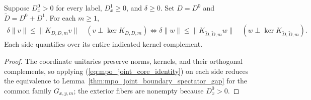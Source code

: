 
\begin{lemma}
    \label{thm:mpo_joint_normalized_gap_equivalence}
    \leanok
    Suppose $D_x^0>0$ for every label, $D_x^1\geq0$, and $\delta\geq0$.
    Set $D=D^0$ and $\widetilde D=D^0+D^1$. For each $m\geq1$,
    \begin{align}
        \delta\|v\|\leq\|K_{D,D,m}v\|
        \quad(v\perp\ker K_{D,D,m})
        \iff
        \delta\|w\|\leq\|K_{\widetilde D,\widetilde D,m}w\|
        \quad(w\perp\ker K_{\widetilde D,\widetilde D,m}).
    \end{align}
    Each side quantifies over its entire indicated kernel complement.
\end{lemma}
\begin{proof}
    \leanok
    The coordinate unitaries preserve norms, kernels, and their orthogonal
    complements, so applying (\ref{eq:mpo_joint_core_identity}) on each
    side reduces the equivalence to
    Lemma~\ref{thm:mpo_joint_boundary_spectator_gap} for the common
    family $G_{x,y,m}$; the exterior fibers are nonempty because $D_x^0>0$.
\end{proof}
